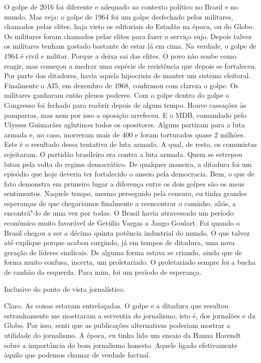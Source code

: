 \falaM O golpe de 2016 foi diferente e adequado ao contexto político no
Brasil e no mundo. Mas veja: o golpe de 1964 foi um golpe desfechado
pelos militares, chamados pelas elites, haja visto os editoriais do
Estadão na época, ou do Globo. Os militares foram chamados pelas elites
para fazer o serviço sujo. Depois talvez os militares tenham gostado
bastante de estar lá em cima. Na verdade, o golpe de 1964 é civil e
militar. Porque a deixa sai das elites. O povo não soube como reagir,
mas começou a medrar uma espécie de resistência que depois se
fortaleceu. Por parte dos ditadores, havia aquela hipocrisia de manter
um sistema eleitoral. Finalmente o AI5, em dezembro de 1968, confirmou
com clareza o golpe. Os militares ganharam então plenos poderes. Com o
golpe dentro do golpe o Congresso foi fechado para reabrir depois de
algum tempo. Houve cassações às pamparras, mas nem por isso a oposição
arrefeceu. E o MDB, comandado pelo Ulysses Guimarães aglutinou todos os
opositores. Alguns partiram para a luta armada e, no caso, morreram mais
de 400 e foram torturados quase 2 milhões. Este é o resultado dessa
tentativa de luta armada. A qual, de resto, os comunistas rejeitaram. O
partidão brasileiro era contra a luta armada. Quem se estrepou lutou
pela volta do regime democrático. De qualquer maneira, a ditadura foi um
episódio que hoje deveria ter fortalecido o anseio pela democracia. Bem,
o que de fato demonstra em primeiro lugar a diferença entre os dois
golpes são os meus sentimentos. Naquele tempo, mesmo perseguido pela
censura, eu tinha grandes esperanças de que chegaríamos finalmente a
reencontrar o caminho, aliás, a encontrá"-lo de uma vez por todas. O
Brasil havia atravessado um período econômico muito favorável de Getúlio
Vargas a Jango Goulart. Foi quando o Brasil chegou a ser a décima quinta
potência industrial do mundo. O que talvez até explique porque acabou
surgindo, já em tempos de ditadura, uma nova geração de líderes
sindicais. De alguma forma estava se criando, ainda que de forma muito
confusa, incerta, um proletariado. O proletariado sempre foi a bucha de
canhão da esquerda. Para mim, foi um período de esperança.

\falaG Inclusive do ponto de vista jornalístico.

\falaM Claro. As coisas estavam entrelaçadas. O golpe e a ditadura que
resultou estranhamente me mostraram a serventia do jornalismo, isto é,
dos jornalões e da Globo. Por isso, senti que as publicações
alternativas poderiam mostrar a utilidade do jornalismo. A época, eu
tinha lido um ensaio da Hanna Harendt sobre a importância do bom
jornalismo honesto. Aquele ligado efetivamente àquilo que podemos chamar
de verdade factual.

